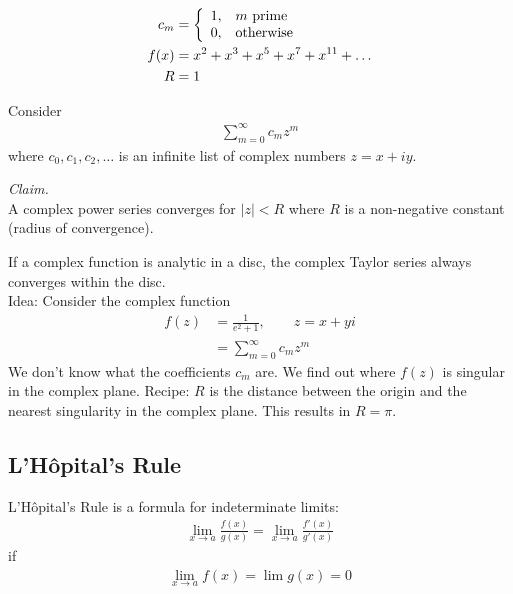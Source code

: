 \begin{ex}
	\begin{align*}
	c_m & = \left\{
	\begin{array}{l l}
	1, & m~ \text{prime} \\
	0, & \text{otherwise}
	\end{array} \right. \\
	f(x) & = x^2 + x^3 + x^5+ x^7 +x^{11} + \dots \\
	R & = 1
	\end{align*}
\end{ex}


\begin{df}
	Consider
	\begin{align*}
	\sum_{m = 0}^\infty c_m z^m
	\end{align*}
	where $c_0, c_1, c_2, \dots$ is an infinite list of complex numbers $z = x + iy$.
\end{df}

\emph{Claim.} \\
A complex power series converges for $|z| < R$ where $R$ is a non-negative constant (radius of convergence).


If a complex function is analytic in a disc, the complex Taylor series always converges within the disc.
\\

Idea: Consider the complex function
\begin{align*}
f(z) & = \frac 1 {e^2+1}, \qquad z = x+yi \\
& = \sum_{m=0}^\infty c_m z^m
\end{align*}
We don't know what the coefficients $c_m$ are. We find out where $f(z)$ is singular in the complex plane.
Recipe: $R$ is the distance between the origin and the nearest singularity in the complex plane. This results in $R= \pi$.

\subsection{L'H\^opital's Rule}
L'H\^opital's Rule is a formula for indeterminate limits:
\begin{align*}
\lim_{x \to a} \frac{f(x)}{g(x)} = \lim_{x \to a} \frac{f'(x)}{g'(x)}
\end{align*} 
if
\begin{align*}
\lim_{x \to a} f(x) = \lim g(x) = 0
\end{align*}

